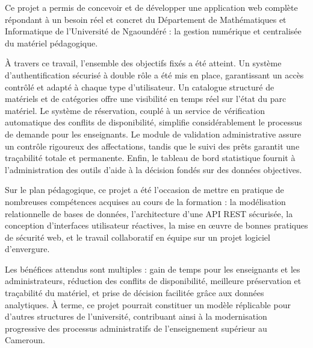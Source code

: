 \documentclass[12pt,a4paper]{report}
\begin{document}
Ce projet a permis de concevoir et de d\'evelopper une application web
compl\`ete r\'epondant \`a un besoin r\'eel et concret du D\'epartement
de Math\'ematiques et Informatique de l'Universit\'e de Ngaound\'er\'e :
la gestion num\'erique et centralis\'ee du mat\'eriel p\'edagogique.

\`A travers ce travail, l'ensemble des objectifs fix\'es a \'et\'e
atteint. Un syst\`eme d'authentification s\'ecuris\'e \`a double r\^ole
a \'et\'e mis en place, garantissant un acc\`es contr\^ol\'e et adapt\'e
\`a chaque type d'utilisateur. Un catalogue structur\'e de mat\'eriels et
de cat\'egories offre une visibilit\'e en temps r\'eel sur l'\'etat du parc
mat\'eriel. Le syst\`eme de r\'eservation, coupl\'e \`a un service de
v\'erification automatique des conflits de disponibilit\'e, simplifie
consid\'erablement le processus de demande pour les enseignants. Le module
de validation administrative assure un contr\^ole rigoureux des
affectations, tandis que le suivi des pr\^ets garantit une tra\c{c}abilit\'e
totale et permanente. Enfin, le tableau de bord statistique fournit \`a
l'administration des outils d'aide \`a la d\'ecision fond\'es sur des
donn\'ees objectives.

Sur le plan p\'edagogique, ce projet a \'et\'e l'occasion de mettre en
pratique de nombreuses comp\'etences acquises au cours de la formation :
la mod\'elisation relationnelle de bases de donn\'ees, l'architecture
d'une API REST s\'ecuris\'ee, la conception d'interfaces utilisateur
r\'eactives, la mise en {\oe}uvre de bonnes pratiques de s\'ecurit\'e web,
et le travail collaboratif en \'equipe sur un projet logiciel d'envergure.

Les b\'en\'efices attendus sont multiples : gain de temps pour les
enseignants et les administrateurs, r\'eduction des conflits de
disponibilit\'e, meilleure pr\'eservation et tra\c{c}abilit\'e du
mat\'eriel, et prise de d\'ecision facilit\'ee gr\^ace aux donn\'ees
analytiques. \`A terme, ce projet pourrait constituer un mod\`ele
r\'eplicable pour d'autres structures de l'universit\'e, contribuant ainsi
\`a la modernisation progressive des processus administratifs de
l'enseignement sup\'erieur au Cameroun.
\end{document}
